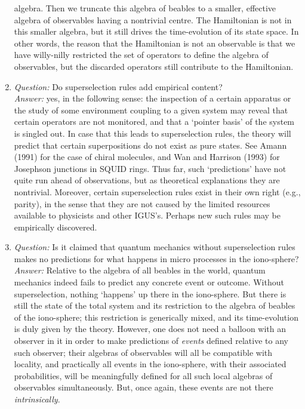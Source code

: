 \begin{enumerate}
algebra. Then we truncate
this algebra of beables to a smaller, effective algebra of observables having a
nontrivial centre.
The Hamiltonian is not in this smaller algebra, but it still drives the
time-evolution of its state
space. In other words, the reason that the Hamiltonian is not an observable is
that we have
willy-nilly restricted the set of operators to define the algebra of
observables, but the discarded
operators still contribute to the Hamiltonian.
\item {\em Question:}  Do superselection rules add
empirical content?\\ {\em Answer:} yes,  in the following sense:  the
inspection of a certain
apparatus or the study of some environment coupling to a given system may
reveal that certain
operators are not monitored, and that a `pointer basis' of the system is
singled out. In case that
this  leads to superselection rules, the theory will predict that certain
superpositions do not exist
as pure states. See Amann (1991)  for the case of chiral molecules, and  Wan
and Harrison (1993) for
Josephson junctions in SQUID rings. Thus far, such `predictions' have not quite
run ahead of
observations, but as theoretical explanations they are nontrivial. Moreover,
certain superselection
rules exist in their own right (e.g., parity), in the sense that they are not
caused by the limited
resources available to physicists and other IGUS's.  Perhaps new such rules may
be empirically
discovered.
  \item {\em Question:} Is it claimed that quantum
mechanics without superselection rules makes no predictions for what happens in
micro processes in the
iono-sphere?\\ {\em Answer:} Relative to the algebra of all beables in the
world, quantum mechanics
indeed fails to predict any concrete event or outcome.  Without superselection,
nothing `happens' up
there in the iono-sphere. But there is still the state of the total system and
its restriction to the
algebra of beables of the iono-sphere; this restriction is generically mixed,
and its time-evolution
is duly given by the theory. However, one does not need a balloon with an
observer  in it in order to
make predictions of {\em events} defined relative to any such observer; their
algebras of observables
will all be compatible with locality, and practically all events in the
iono-sphere, with their
associated probabilities,  will be meaningfully defined for all such local
algebras of observables
simultaneously. But, once again, these events are not there {\em
intrinsically}.
\end{enumerate}
